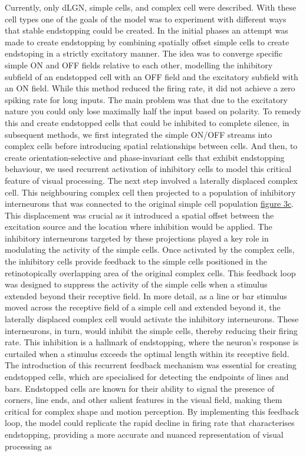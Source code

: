 \documentclass[12pt]{article}
\begin{document}
Currently, only dLGN, simple cells, and complex cell were described. With these cell types one of the goals of the model was to experiment with different ways that stable endstopping could be created. In the initial phases an attempt was made to create endstopping by combining spatially offset simple cells to create endstoping in a strictly excitatory manner. The idea was to converge specific simple ON and OFF fields relative to each other, modelling the inhibitory subfield of an endstopped cell with an OFF field and the excitatory subfield with an ON field. While this method reduced the firing rate, it did not achieve a zero spiking rate for long inputs. The main problem was that due to the excitatory nature you could only lose maximally half the input based on polarity. To remedy this and create endstopped cells that could be inhibited to complete silence, in subsequent methods, we first integrated the simple ON/OFF streams into complex cells before introducing spatial relationships between cells. And then, to create orientation-selective and phase-invariant cells that exhibit endstopping behaviour, we used recurrent activation of inhibitory cells to model this critical feature of visual processing. The next step involved a laterally displaced complex cell. This neighbouring complex cell then projected to a population of inhibitory interneurons that was connected to the original simple cell population \hyperref[fig:LIF_Overview]{figure 3c}. This displacement was crucial as it introduced a spatial offset between the excitation source and the location where inhibition would be applied. The inhibitory interneurons targeted by these projections played a key role in modulating the activity of the simple cells. Once activated by the complex cells, the inhibitory cells provide feedback to the simple cells positioned in the retinotopically overlapping area of the original complex cells. This feedback loop was designed to suppress the activity of the simple cells when a stimulus extended beyond their receptive field. In more detail, as a line or bar stimulus moved across the receptive field of a simple cell and extended beyond it, the laterally displaced complex cell would activate the inhibitory interneurons. These interneurons, in turn, would inhibit the simple cells, thereby reducing their firing rate. This inhibition is a hallmark of endstopping, where the neuron's response is curtailed when a stimulus exceeds the optimal length within its receptive field. The introduction of this recurrent feedback mechanism was essential for creating endstopped cells, which are specialised for detecting the endpoints of lines and bars. Endstopped cells are known for their ability to signal the presence of corners, line ends, and other salient features in the visual field, making them critical for complex shape and motion perception. By implementing this feedback loop, the model could replicate the rapid decline in firing rate that characterises endstopping, providing a more accurate and nuanced representation of visual processing as 
\end{document}

